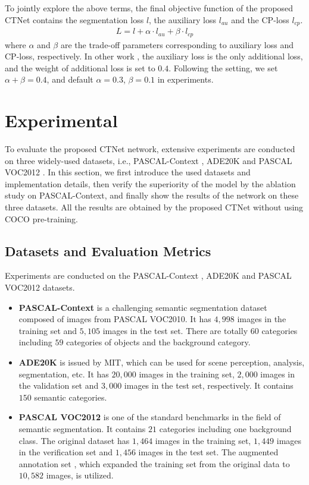 \documentclass[10pt,journal,cspaper,compsoc]{IEEEtran}
\begin{document}
To jointly explore the above terms, the final objective function of the proposed CTNet contains the segmentation loss $l$, the auxiliary loss $l_{au}$ and the CP-loss $l_{cp}$.
\begin{align}
L = l + \alpha  \cdot {l_{au}} +  \beta \cdot {l_{cp}}
\end{align}
where $\alpha$ and $\beta$ are the trade-off parameters corresponding to auxiliary loss and CP-loss, respectively. In other work \cite{huang2019ccnet, li2019expectation, yuan2020object}, the auxiliary loss is the only additional loss, and the weight of additional loss is set to $0.4$. Following the setting, we set $\alpha+\beta=0.4$, and default $\alpha=0.3$, $\beta=0.1$ in experiments.
	
\section{Experimental}
\label{exp}
To evaluate the proposed CTNet network, extensive experiments are conducted on three widely-used datasets, i.e., PASCAL-Context \cite{mottaghi2014role}, ADE20K \cite{zhou2017scene} and PASCAL VOC2012 \cite{everingham2010pascal}. In this section, we first introduce the used datasets and implementation details, then verify the superiority of the model by the ablation study on PASCAL-Context, and finally show the results of the network on these three datasets. All the results are obtained by the proposed CTNet without using COCO pre-training.
	
\subsection{Datasets and Evaluation Metrics}
Experiments are conducted on the PASCAL-Context \cite{mottaghi2014role}, ADE20K \cite{zhou2017scene} and PASCAL VOC2012 \cite{everingham2010pascal} datasets.
\begin{itemize}
\item \textbf{PASCAL-Context} \cite{mottaghi2014role} is a challenging semantic segmentation dataset composed of images from PASCAL VOC2010. It has $4,998$ images in the training set and $5,105$ images in the test set. There are totally $60$ categories including $59$ categories of objects and the background category.   
\item \textbf{ADE20K} \cite{zhou2017scene} is issued by MIT, which can be used for scene perception, analysis, segmentation, etc. It has $20,000$ images in the training set, $2,000$ images in the validation set and $3,000$ images in the test set, respectively. It contains $150$ semantic categories.
\item \textbf{PASCAL VOC2012} \cite{everingham2010pascal} is one of the standard benchmarks in the field of semantic segmentation. It contains $21$ categories including one background class. The original dataset has $1,464$ images in the training set, $1,449$ images in the verification set and $1,456$ images in the test set. The augmented annotation set \cite{hariharan2015hypercolumns}, which expanded the training set from the original data to $10,582$ images, is utilized.
\end{itemize}
	
\end{document}

